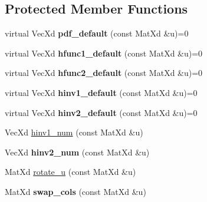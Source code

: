 \subsection*{Protected Member Functions}
\begin{DoxyCompactItemize}
\item 
\mbox{\label{class_bicop_a89e76fb74a9a4583cd74ce7bd72b5821}} 
virtual Vec\+Xd {\bfseries pdf\+\_\+default} (const Mat\+Xd \&u)=0
\item 
\mbox{\label{class_bicop_a60b997ec055f573034fc1736470ed7db}} 
virtual Vec\+Xd {\bfseries hfunc1\+\_\+default} (const Mat\+Xd \&u)=0
\item 
\mbox{\label{class_bicop_afb7f326409f22b6b65e46f89dcf5ee1a}} 
virtual Vec\+Xd {\bfseries hfunc2\+\_\+default} (const Mat\+Xd \&u)=0
\item 
\mbox{\label{class_bicop_a401bdcb4172c55b3d5f0c2a0db30ca43}} 
virtual Vec\+Xd {\bfseries hinv1\+\_\+default} (const Mat\+Xd \&u)=0
\item 
\mbox{\label{class_bicop_a046b0fdc43eed27002f0b7c3bc9a9ddb}} 
virtual Vec\+Xd {\bfseries hinv2\+\_\+default} (const Mat\+Xd \&u)=0
\item 
Vec\+Xd \hyperlink{class_bicop_abd517becaa97834eac56b0d1a0c7a666}{hinv1\+\_\+num} (const Mat\+Xd \&u)
\item 
\mbox{\label{class_bicop_a2b262e9e2adee0c215da47467f1dec45}} 
Vec\+Xd {\bfseries hinv2\+\_\+num} (const Mat\+Xd \&u)
\item 
Mat\+Xd \hyperlink{class_bicop_aea1c2388f6312078d943dd31f91f065f}{rotate\+\_\+u} (const Mat\+Xd \&u)
\item 
\mbox{\label{class_bicop_a96e06c8996e378d56d9e87ff4d1a24ac}} 
Mat\+Xd {\bfseries swap\+\_\+cols} (const Mat\+Xd \&u)
\end{DoxyCompactItemize}
